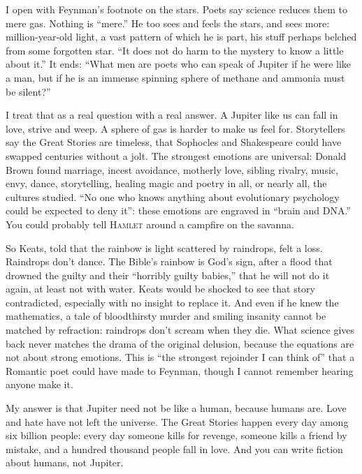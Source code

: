 
I open with Feynman's footnote on the stars. Poets say science reduces them to mere gas. Nothing is ``mere.'' He too sees and feels the stars, and sees more: million-year-old light, a vast pattern of which he is part, his stuff perhaps belched from some forgotten star. ``It does not do harm to the mystery to know a little about it.'' It ends: ``What men are poets who can speak of Jupiter if he were like a man, but if he is an immense spinning sphere of methane and ammonia must be silent?''

I treat that as a real question with a real answer. A Jupiter like us can fall in love, strive and weep. A sphere of gas is harder to make us feel for. Storytellers say the Great Stories are timeless, that Sophocles and Shakespeare could have swapped centuries without a jolt. The strongest emotions are universal: Donald Brown found marriage, incest avoidance, motherly love, sibling rivalry, music, envy, dance, storytelling, healing magic and poetry in all, or nearly all, the cultures studied. ``No one who knows anything about evolutionary psychology could be expected to deny it'': these emotions are engraved in ``brain and DNA.''  You could probably tell \textsc{Hamlet} around a campfire on the savanna.

So Keats, told that the rainbow is light scattered by raindrops, felt a loss. Raindrops don't dance. The Bible's rainbow is God's sign, after a flood that drowned the guilty and their ``horribly guilty babies,'' that he will not do it again, at least not with water. Keats would be shocked to see that story contradicted, especially with no insight to replace it. And even if he knew the mathematics, a tale of bloodthirsty murder and smiling insanity cannot be matched by refraction: raindrops don't scream when they die. What science gives back never matches the drama of the original delusion, because the equations are not about strong emotions. This is ``the strongest rejoinder I can think of'' that a Romantic poet could have made to Feynman, though I cannot remember hearing anyone make it.

My answer is that Jupiter need not be like a human, because humans are. Love and hate have not left the universe. The Great Stories happen every day among six billion people: every day someone kills for revenge, someone kills a friend by mistake, and a hundred thousand people fall in love. And you can write fiction about humans, not Jupiter.

